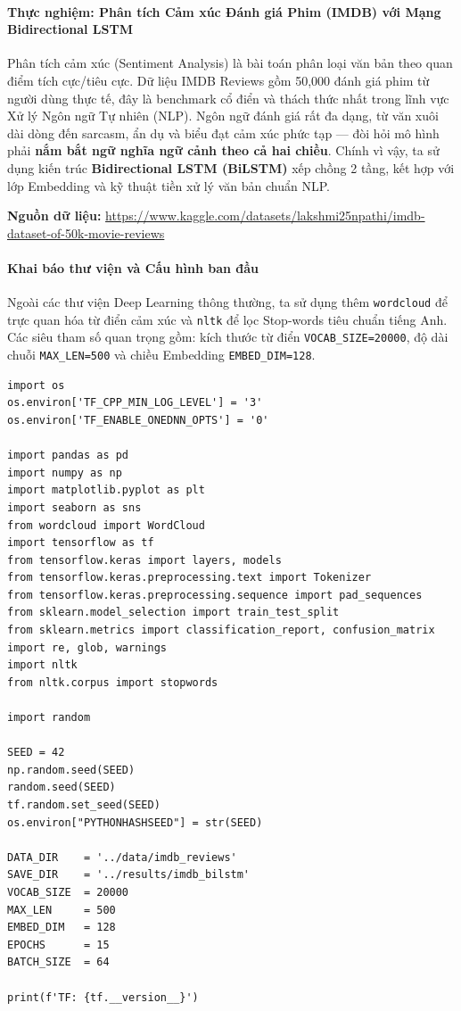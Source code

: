 \paragraph{Thực nghiệm: Phân tích Cảm xúc Đánh giá Phim (IMDB) với Mạng Bidirectional LSTM} \hfill\mbox{}

Phân tích cảm xúc (Sentiment Analysis) là bài toán phân loại văn bản theo quan điểm tích cực/tiêu cực. Dữ liệu IMDB Reviews gồm 50,000 đánh giá phim từ người dùng thực tế, đây là benchmark cổ điển và thách thức nhất trong lĩnh vực Xử lý Ngôn ngữ Tự nhiên (NLP). Ngôn ngữ đánh giá rất đa dạng, từ văn xuôi dài dòng đến sarcasm, ẩn dụ và biểu đạt cảm xúc phức tạp --- đòi hỏi mô hình phải \textbf{nắm bắt ngữ nghĩa ngữ cảnh theo cả hai chiều}. Chính vì vậy, ta sử dụng kiến trúc \textbf{Bidirectional LSTM (BiLSTM)} xếp chồng 2 tầng, kết hợp với lớp Embedding và kỹ thuật tiền xử lý văn bản chuẩn NLP.

\begin{center}
    \textbf{Nguồn dữ liệu:} \url{https://www.kaggle.com/datasets/lakshmi25npathi/imdb-dataset-of-50k-movie-reviews}
\end{center}

\paragraph{Khai báo thư viện và Cấu hình ban đầu} \hfill\mbox{}

Ngoài các thư viện Deep Learning thông thường, ta sử dụng thêm \texttt{wordcloud} để trực quan hóa từ điển cảm xúc và \texttt{nltk} để lọc Stop-words tiêu chuẩn tiếng Anh. Các siêu tham số quan trọng gồm: kích thước từ điển \texttt{VOCAB\_SIZE=20000}, độ dài chuỗi \texttt{MAX\_LEN=500} và chiều Embedding \texttt{EMBED\_DIM=128}.

\begin{lstlisting}[style=pythoncode, caption={Khai báo thư viện và thiết lập siêu tham số}]
import os
os.environ['TF_CPP_MIN_LOG_LEVEL'] = '3'
os.environ['TF_ENABLE_ONEDNN_OPTS'] = '0'

import pandas as pd
import numpy as np
import matplotlib.pyplot as plt
import seaborn as sns
from wordcloud import WordCloud
import tensorflow as tf
from tensorflow.keras import layers, models
from tensorflow.keras.preprocessing.text import Tokenizer
from tensorflow.keras.preprocessing.sequence import pad_sequences
from sklearn.model_selection import train_test_split
from sklearn.metrics import classification_report, confusion_matrix
import re, glob, warnings
import nltk
from nltk.corpus import stopwords

import random

SEED = 42
np.random.seed(SEED)
random.seed(SEED)
tf.random.set_seed(SEED)
os.environ["PYTHONHASHSEED"] = str(SEED)

DATA_DIR    = '../data/imdb_reviews'
SAVE_DIR    = '../results/imdb_bilstm'
VOCAB_SIZE  = 20000
MAX_LEN     = 500
EMBED_DIM   = 128
EPOCHS      = 15
BATCH_SIZE  = 64

print(f'TF: {tf.__version__}')
\end{lstlisting}

